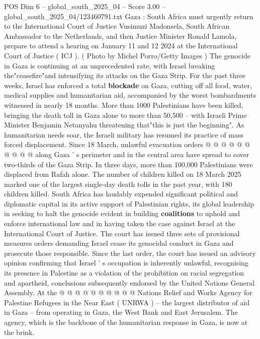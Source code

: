 \begin{textsample}{POS Dim 6 – global\_south\_2025\_04 – Score 3.00 – global\_south\_2025\_04/123460791.txt}  \label{ex:f6_pos_288}
Gaza : South Africa must urgently return to the International Court of Justice Vusimuzi Madonsela, South African Ambassador to the Netherlands, and then Justice Minister Ronald Lamola, prepare to attend a hearing on January 11 and 12 2024 at the International Court of Justice ( ICJ ). ( Photo by Michel Porro/Getty Images ) The genocide in Gaza is continuing at an unprecedented rate, with Israel breaking the"ceasefire"and intensifying its attacks on the Gaza Strip.
For the past three weeks, Israel has enforced a total \textbf{blockade} on Gaza, cutting off all food, water, medical supplies and humanitarian aid, accompanied by the worst bombardments witnessed in nearly 18 months.
More than 1000 Palestinians have been killed, bringing the death toll in Gaza alone to more than 50,500 -- with Israeli Prime Minister Benjamin Netanyahu threatening that"this is just the beginning".
As humanitarian needs soar, the Israeli military has resumed its practice of mass forced displacement.
Since 18 March, unlawful evacuation orders @ @ @ @ @ @ @ @ @ @ along Gaza ' s perimeter and in the central area have spread to cover two-thirds of the Gaza Strip.
In three days, more than 100,000 Palestinians were displaced from Rafah alone.
The number of children killed on 18 March 2025 marked one of the largest single-day death tolls in the past year, with 180 children killed.
South Africa has laudably expended significant political and diplomatic capital in its active support of Palestinian rights, its global leadership in seeking to halt the genocide evident in building \textbf{coalitions} to uphold and enforce international law and in having taken the case against Israel at the International Court of Justice.
The court has issued three sets of provisional measures orders demanding Israel cease its genocidal conduct in Gaza and prosecute those responsible.
Since the last order, the court has issued an advisory opinion confirming that Israel ' s occupation is inherently unlawful, recognising its presence in Palestine as a violation of the prohibition on racial segregation and apartheid, conclusions subsequently endorsed by the United Nations General Assembly.
At the @ @ @ @ @ @ @ @ @ @ Nations Relief and Works Agency for Palestine Refugees in the Near East ( UNRWA ) -- the largest distributor of aid in Gaza -- from operating in Gaza, the West Bank and East Jerusalem.
The agency, which is the backbone of the humanitarian response in Gaza, is now at the brink.

\end{textsample}
